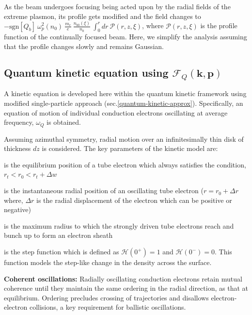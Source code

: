\documentclass[aps,twocolumn,notitlepage,superscriptaddress]{revtex4-1}
\renewcommand\vec{\mathbf}
\begin{document}
As the beam undergoes focusing being acted upon by the radial fields of the extreme plasmon, its profile gets modified and the field changes to $- \mathrm{ sgn}[Q_b] ~ \omega_{p}^2(n_0) ~ \frac{m_e}{e} ~ \frac{n_{b0}(\xi)}{n_0} ~ \int_{0}^{r} dr ~ \mathcal{P}(r,z,\xi)$, where $\mathcal{P}(r,z,\xi)$ is the profile function of the continually focused beam. Here, we simplify the analysis assuming that the profile changes slowly and remains Gaussian.

\subsection{Quantum kinetic equation using $\mathscr{F}_Q(\vec{k},\vec{p})$}

A kinetic equation is developed here within the quantum kinetic framework using modified single-particle approach (sec.\ref{quantum-kinetic-approx}). Specifically, an equation of motion of individual conduction electrons oscillating at average frequency, $\omega_Q$ is obtained. 

Assuming azimuthal symmetry, radial motion over an infinitesimally thin disk of thickness $dz$ is considered. The key parameters of the kinetic model are:
\begin{description}[itemsep=0pt, topsep=0pt, parsep=0pt]
\item[$r_0$] is the equilibrium position of a tube electron which always satisfies the condition, $r_t < r_0 < r_t+\Delta w$
\item[$r(t)$] is the instantaneous radial position of an oscillating tube electron ($r = r_0 + \Delta r$ where, $\Delta r$ is the radial displacement of the electron which can be positive or negative)
\item[$r_m$] is the maximum radius to which the strongly driven tube electrons reach and bunch up to form an electron sheath 
\item[$\mathcal{H}(r)$] is the step function which is defined as $\mathcal H(0^+) = 1$ and $\mathcal H(0^-) = 0$. This function models the step-like change in the density across the surface.
\end{description}

{\bf Coherent oscillations:}  Radially oscillating conduction electrons retain mutual coherence until they maintain the same ordering in the radial direction, as that at equilibrium. Ordering precludes crossing of trajectories and disallows electron-electron collisions, a key requirement for ballistic oscillations.
\end{document}
